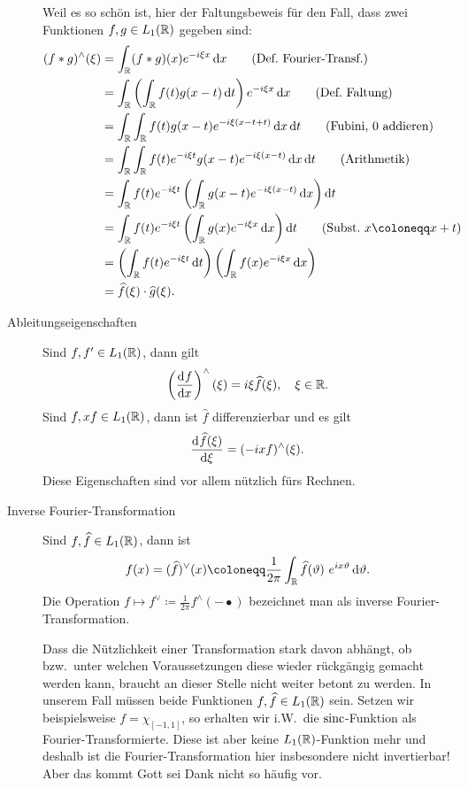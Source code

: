 \begin{remark}
\begin{description}
    Weil es so schön ist, hier der Faltungsbeweis für den Fall, dass zwei Funktionen
    $ f,g \in L_{1}(\mathbb{R}) $ gegeben sind:
    \begin{align}
       (f * g)^{\wedge}(\xi)
    &= \int_{\R} (f * g)(x) e^{-i\xi x} \dif x \tag{Def.\ Fourier-Transf.} \\
    &= \int_{\R} \left( \int_{\R} f(t) g(x - t) \dif t \right) e^{-i\xi x} \dif x 
        \tag{Def.\ Faltung} \\
    &= \int_{\R} \int_{\R} f(t) g(x - t)  e^{-i\xi (x - t + t)} \dif x \dif t
        \tag{Fubini, $ 0 $ addieren} \\
    &= \int_{\R} \int_{\R} f(t) e^{-i\xi t} g(x - t) e^{-i\xi (x - t)} \dif x \dif t 
         \tag{Arithmetik} \\
    &= \int_{\R} f(t) e^{-i\xi t} \left( \int_{\R} g(x - t) e^{-i\xi (x - t)} \dif x \right) \dif t 
        \notag \\
    &= \int_{\R} f(t) e^{-i\xi t} \left( \int_{\R} g(x) e^{-i\xi x} \dif x \right) \dif t 
        \tag{Subst.\ $ x \coloneqq x + t $} \\
    &= \left( \int_{\R} f(t) e^{-i\xi t} \dif t \right)
       \left( \int_{\R} f(x) e^{-i\xi x} \dif x \right) \notag \\
    &= \widehat{f}(\xi) \cdot \widehat{g}(\xi) \notag .
    \end{align}
        
		\item [Ableitungseigenschaften] Sind $ f, f' \in L_{1}(\mathbb{R}) $, dann gilt
    \[
      \left( \dod{f}{x} \right)^{\wedge}(\xi) = i\xi \widehat{f}(\xi), \quad \xi \in \R.
    \]
    Sind $ f, xf \in L_{1}(\mathbb{R}) $, dann ist $ \widehat{f} $ differenzierbar und es gilt
    \[
      \dod{\widehat{f}(\xi)}{\xi} = (-ix f)^{\wedge}(\xi).
    \]
    Diese Eigenschaften sind vor allem nützlich fürs Rechnen.
    
		\item [Inverse Fourier-Transformation] Sind $ f, \widehat{f} \in L_{1}(\mathbb{R}) $, dann ist
		\[
  		f(x) = (\widehat{f})^{\vee}(x) \coloneqq 
    		\frac{1}{2\pi} \int_{\R} \widehat{f}(\vartheta) \ e^{i x \vartheta} \dif \vartheta.
		\]
		Die Operation $ f \mapsto f^{\vee} \coloneqq \frac{1}{2\pi} f^{\wedge}(-\bullet) $ bezeichnet
		man als inverse Fourier-Transformation. 
		
		Dass die Nützlichkeit einer Transformation stark
		davon abhängt, ob bzw.\ unter welchen Voraussetzungen diese wieder rückgängig gemacht werden 
		kann, braucht an dieser Stelle nicht weiter betont zu werden. In unserem Fall müssen beide
		Funktionen $ f, \widehat{f} \in L_{1}(\mathbb{R}) $ sein. Setzen wir beispielsweise
		$ f = \chi_{[-1,1]} $, so erhalten wir i.W.\ die $ \operatorname{sinc} $-Funktion als Fourier-Transformierte.
		Diese ist aber keine $ L_{1}(\mathbb{R}) $-Funktion mehr und deshalb ist die Fourier-Transformation hier
		insbesondere nicht invertierbar! Aber das kommt Gott sei Dank nicht so häufig vor.
		

\end{description}
\end{remark}
